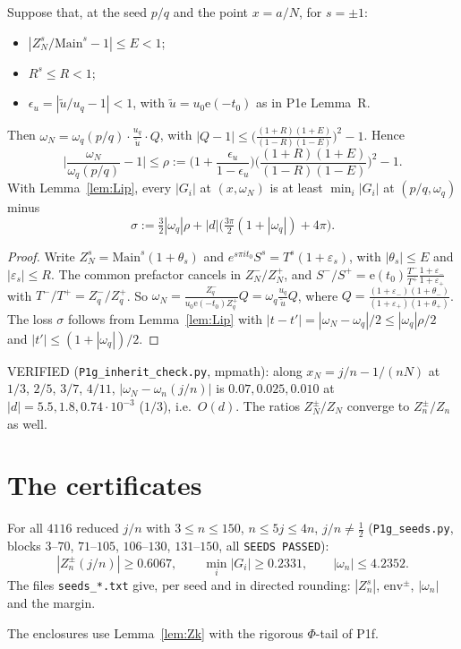 \documentclass[11pt]{article}
\theoremstyle{definition}\newtheorem{definition}[theorem]{Definition}
\theoremstyle{remark}\newtheorem{remark}[theorem]{Remark}
\newcommand{\e}{\mathrm{e}}
\begin{document}
\begin{lemma}\label{lem:I}
Suppose that, at the seed $p/q$ and the point $x=a/N$, for $s=\pm1$:
\begin{itemize}
\item $|Z^s_N/\mathrm{Main}^s-1|\le E<1$;
\item $R^s\le R<1$;
\item $\epsilon_u=|\tilde u/u_q-1|<1$, with $\tilde u=u_0\e(-t_0)$ as in P1e Lemma~R.
\end{itemize}
Then $\omega_N=\omega_q(p/q)\cdot\frac{u_q}{\tilde u}\cdot Q$, with $|Q-1|\le\big(\frac{(1+R)(1+E)}{(1-R)(1-E)}\big)^2-1$. Hence
\[\Big|\frac{\omega_N}{\omega_q(p/q)}-1\Big|\le\rho:=\Big(1+\frac{\epsilon_u}{1-\epsilon_u}\Big)\Big(\frac{(1+R)(1+E)}{(1-R)(1-E)}\Big)^2-1 .\]
With Lemma~\ref{lem:Lip}, every $|G_i|$ at $(x,\omega_N)$ is at least $\min_i|G_i|$ at $(p/q,\omega_q)$ minus
\[\sigma:=\tfrac32|\omega_q|\rho+|d|\big(\tfrac{3\pi}2(1+|\omega_q|)+4\pi\big).\]
\end{lemma}
\begin{proof}
Write $Z^s_N=\mathrm{Main}^s(1+\theta_s)$ and $e^{s\pi it_0}S^s=T^s(1+\varepsilon_s)$, with $|\theta_s|\le E$ and $|\varepsilon_s|\le R$.
The common prefactor cancels in $Z^-_N/Z^+_N$, and $S^-/S^+=\e(t_0)\frac{T^-}{T^+}\frac{1+\varepsilon_-}{1+\varepsilon_+}$ with $T^-/T^+=Z^-_q/Z^+_q$.
So $\omega_N=\frac{Z^-_q}{u_0\e(-t_0)Z^+_q}Q=\omega_q\frac{u_q}{\tilde u}Q$, where $Q=\frac{(1+\varepsilon_-)(1+\theta_-)}{(1+\varepsilon_+)(1+\theta_+)}$.
The loss $\sigma$ follows from Lemma~\ref{lem:Lip} with $|t-t'|=|\omega_N-\omega_q|/2\le|\omega_q|\rho/2$ and $|t'|\le(1+|\omega_q|)/2$.
\end{proof}
VERIFIED (\texttt{P1g\_inherit\_check.py}, mpmath): along $x_N=j/n-1/(nN)$ at $1/3$, $2/5$, $3/7$, $4/11$, $|\omega_N-\omega_n(j/n)|$ is $0.07,0.025,0.010$ at $|d|=5.5,1.8,0.74\cdot10^{-3}$ ($1/3$), i.e.\ $O(d)$. The ratios $Z^\pm_N/Z_N$ converge to $Z^\pm_n/Z_n$ as well.

\section{The certificates}\label{sec:cert}
\begin{proposition}\label{prop:S}
For all $4116$ reduced $j/n$ with $3\le n\le150$, $n\le5j\le4n$, $j/n\ne\frac12$ (\texttt{P1g\_seeds.py}, blocks $3$--$70$, $71$--$105$, $106$--$130$, $131$--$150$, all \texttt{SEEDS PASSED}):
\[|Z^\pm_n(j/n)|\ge0.6067,\qquad\min_i|G_i|\ge0.2331,\qquad|\omega_n|\le4.2352.\]
The files \texttt{seeds\_*.txt} give, per seed and in directed rounding: $|Z^s_n|$, $\mathrm{env}^\pm$, $|\omega_n|$ and the margin.
\end{proposition}
The enclosures use Lemma~\ref{lem:Zk} with the rigorous $\Phi$-tail of P1f.
\end{document}
